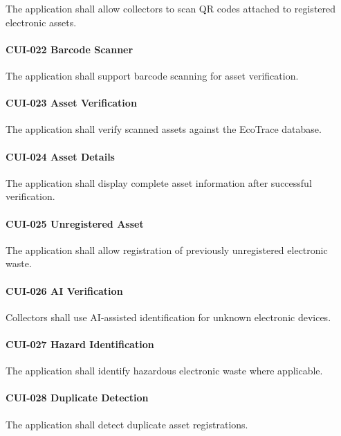 The application shall allow collectors to scan QR codes attached to
registered electronic assets.

\paragraph{CUI-022 Barcode Scanner}

The application shall support barcode scanning for asset verification.

\paragraph{CUI-023 Asset Verification}

The application shall verify scanned assets against the EcoTrace
database.

\paragraph{CUI-024 Asset Details}

The application shall display complete asset information after
successful verification.

\paragraph{CUI-025 Unregistered Asset}

The application shall allow registration of previously unregistered
electronic waste.

\paragraph{CUI-026 AI Verification}

Collectors shall use AI-assisted identification for unknown electronic
devices.

\paragraph{CUI-027 Hazard Identification}

The application shall identify hazardous electronic waste where
applicable.

\paragraph{CUI-028 Duplicate Detection}

The application shall detect duplicate asset registrations.

